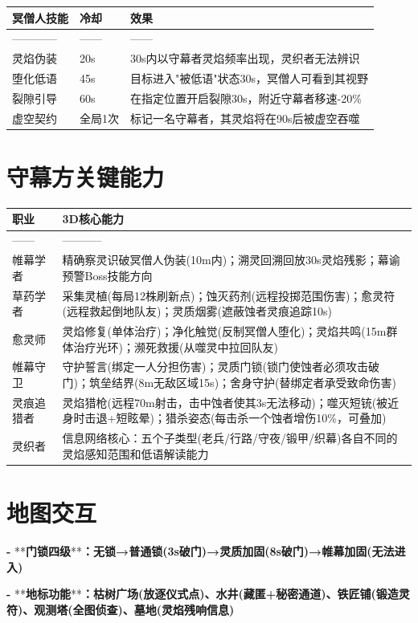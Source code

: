 \documentclass[12pt,a4paper,openany]{ctexbook}
\begin{document}
\begin{tabular}{|l|l|l|}
\hline
冥僧人技能 & 冷却 & 效果 \\
\hline
------------ & ------ & ------ \\
灵焰伪装 & 20s & 30s内以守幕者灵焰频率出现，灵织者无法辨识 \\
堕化低语 & 45s & 目标进入"被低语"状态30s，冥僧人可看到其视野 \\
裂隙引导 & 60s & 在指定位置开启裂隙30s，附近守幕者移速-20\% \\
虚空契约 & 全局1次 & 标记一名守幕者，其灵焰将在90s后被虚空吞噬 \\
\hline
\end{tabular}


\section*{守幕方关键能力}


\begin{tabular}{|l|l|}
\hline
职业 & 3D核心能力 \\
\hline
------ & ----------- \\
帷幕学者 & 精确察灵识破冥僧人伪装(10m内)；溯灵回溯回放30s灵焰残影；幕谕预警Boss技能方向 \\
草药学者 & 采集灵植(每局12株刷新点)；蚀灭药剂(远程投掷范围伤害)；愈灵符(远程救起倒地队友)；灵质烟雾(遮蔽蚀者灵痕追踪10s) \\
愈灵师 & 灵焰修复(单体治疗)；净化触觉(反制冥僧人堕化)；灵焰共鸣(15m群体治疗光环)；濒死救援(从噬灵中拉回队友) \\
帷幕守卫 & 守护誓言(绑定一人分担伤害)；灵质门锁(锁门使蚀者必须攻击破门)；筑垒结界(8m无敌区域15s)；舍身守护(替绑定者承受致命伤害) \\
灵痕追猎者 & 灵焰猎枪(远程70m射击，击中蚀者使其3s无法移动)；噬灭短铳(被近身时击退+短眩晕)；猎杀姿态(每击杀一个蚀者增伤10\%，可叠加) \\
灵织者 & 信息网络核心：五个子类型(老兵/行路/守夜/锻甲/织幕)各自不同的灵焰感知范围和低语解读能力 \\
\hline
\end{tabular}


\section*{地图交互}


\textbf{- }**\textbf{门锁四级}**\textbf{：无锁→普通锁(3s破门)→灵质加固(8s破门)→帷幕加固(无法进入)}

\textbf{- }**\textbf{地标功能}**\textbf{：枯树广场(放逐仪式点)、水井(藏匿+秘密通道)、铁匠铺(锻造灵符)、观测塔(全图侦查)、墓地(灵焰残响信息)}
\end{document}
